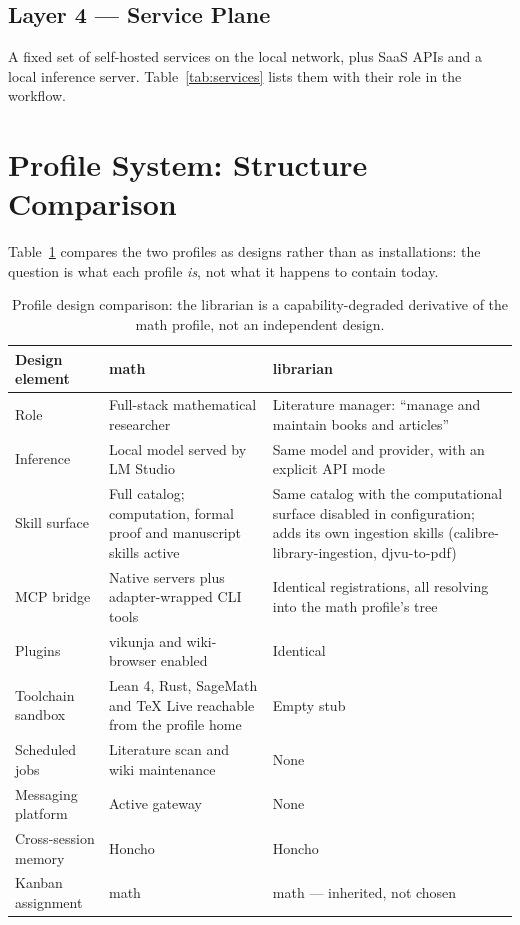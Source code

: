 \documentclass[10pt]{article}
\newcommand{\mono}[1]{{\ttfamily\small #1}}
\begin{document}
\subsection*{Layer 4 --- Service Plane}
A fixed set of self-hosted services on the local network, plus SaaS APIs and a local inference
server. Table~\ref{tab:services} lists them with their role in the workflow.

\section{Profile System: Structure Comparison}\label{sec:profiles}

Table~\ref{tab:profilecmp} compares the two profiles as designs rather than as installations: the
question is what each profile \emph{is}, not what it happens to contain today.

\begin{table}[H]
\centering\small
\caption{Profile design comparison: the librarian is a capability-degraded derivative of the math
profile, not an independent design.}
\label{tab:profilecmp}
\renewcommand{\arraystretch}{1.2}
\begin{tabularx}{\textwidth}{@{}l X X@{}}
\toprule
\textbf{Design element} & \textbf{\mono{math}} & \textbf{\mono{librarian}} \\
\midrule
Role & Full-stack mathematical researcher & Literature manager: ``manage and maintain books and articles'' \\
Inference & Local model served by LM Studio & Same model and provider, with an explicit API mode \\
Skill surface & Full catalog; computation, formal proof and manuscript skills active & Same catalog with the computational surface disabled in configuration; adds its own ingestion skills (\mono{calibre-library-ingestion}, \mono{djvu-to-pdf}) \\
MCP bridge & Native servers plus adapter-wrapped CLI tools & Identical registrations, all resolving into the math profile's tree \\
Plugins & \mono{vikunja} and \mono{wiki-browser} enabled & Identical \\
Toolchain sandbox & Lean 4, Rust, SageMath and TeX Live reachable from the profile home & Empty stub \\
Scheduled jobs & Literature scan and wiki maintenance & None \\
Messaging platform & Active gateway & None \\
Cross-session memory & Honcho & Honcho \\
Kanban assignment & \mono{math} & \mono{math} --- inherited, not chosen \\
\bottomrule
\end{tabularx}
\end{table}
\end{document}
